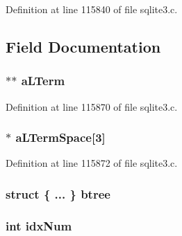 Definition at line 115840 of file sqlite3.\+c.



\subsection{Field Documentation}
\hypertarget{struct_where_loop_aa04716e525cd822b2a4c83d77f0010ad}{}
\subsubsection[{a\+L\+Term}]{$\ast$$\ast$ a\+L\+Term}\label{struct_where_loop_aa04716e525cd822b2a4c83d77f0010ad}


Definition at line 115870 of file sqlite3.\+c.

\hypertarget{struct_where_loop_abaf434cde5deb06833550415691f5444}{}
\subsubsection[{a\+L\+Term\+Space}]{$\ast$ a\+L\+Term\+Space\mbox{[}3\mbox{]}}\label{struct_where_loop_abaf434cde5deb06833550415691f5444}


Definition at line 115872 of file sqlite3.\+c.

\hypertarget{struct_where_loop_aabcedf1144f01ab1953a0a330f5f2851}{}
\subsubsection[{btree}]{\setlength{\rightskip}{0pt plus 5cm}struct \{ ... \}   btree}\label{struct_where_loop_aabcedf1144f01ab1953a0a330f5f2851}
\hypertarget{struct_where_loop_afaf2ebd5db0e0ccaccbcf4e3a7391f58}{}
\subsubsection[{idx\+Num}]{\setlength{\rightskip}{0pt plus 5cm}int idx\+Num}\label{struct_where_loop_afaf2ebd5db0e0ccaccbcf4e3a7391f58}


